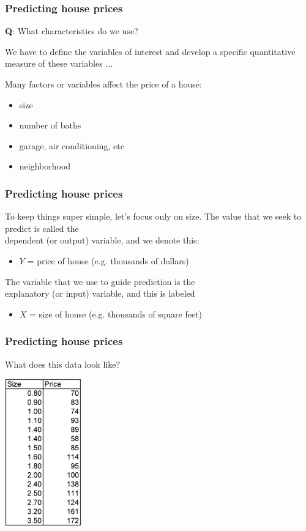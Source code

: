 \documentclass{beamer}
\newcommand{\bo}[1]{\textcolor{burntorange}{#1}}
\newcommand{\bl}{\color{lightblue}}
\newcommand{\rd}{\color{burntorange}}
\newcommand{\bk}{\color{black}}
\newcommand{\bi}{\begin{itemize}}
\newcommand{\ib}{\end{itemize}}
\newcommand{\p}{\item}
\newcommand{\sk}{\vspace{.5cm}}
\begin{document}
\begin{frame}
\frametitle{Predicting house prices} \vspace{-0.5cm}

\sk
\sk

\bl
{\bf Q}: What characteristics do we use?
\sk
\bk

We have to define the \bo{variables of interest} and 
develop a specific quantitative measure of these variables ...

\sk
Many factors or variables affect the price of a house:

\bi
\p size
\p number of baths
\p garage, air conditioning, etc
\p neighborhood 
\ib
\sk

\end{frame}

\begin{frame}
\frametitle{Predicting house prices} \vspace{-0.5cm}

\sk
To keep things super simple, let's focus only on size.
\sk
\sk
The value that we seek to predict is called the \\\rd dependent (or
output) \bk
variable, and we denote this:
\bi \p \bl $Y$ = price of house (e.g. thousands of dollars) \bk\ib

\sk

The variable that we use to guide prediction is the \\\rd 
explanatory (or input) \bk variable, and this is labeled
\bi \p  \bl $X$ = size of house (e.g. thousands of square feet)\bk\ib

\end{frame}

\begin{frame}
\frametitle{Predicting house prices} \vspace{-0.5cm}

What does this data look like?

\sk
\centering \includegraphics[width=1.3in]{figures/housedata}

\end{frame}
\end{document}
